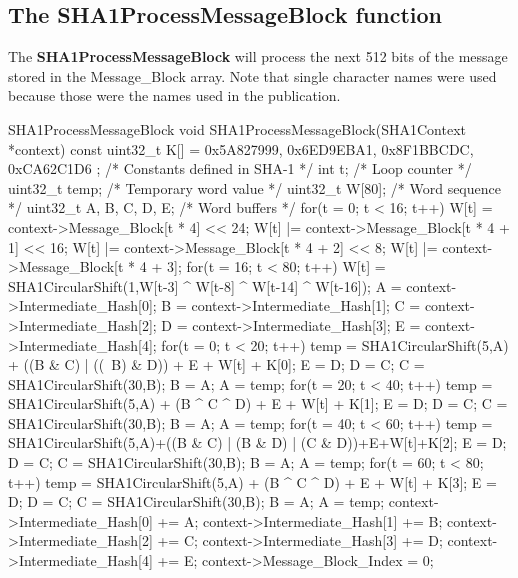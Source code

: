 \subsection{The SHA1ProcessMessageBlock function}
\label{ProcessMessageBlock}
The {\bf SHA1ProcessMessageBlock} will process the next 512 bits 
of the message stored in the Message\_Block array.
Note that single character names were used because those were the
names used in the publication.
\begin{chunk}{SHA1ProcessMessageBlock}
void SHA1ProcessMessageBlock(SHA1Context *context) {
  const uint32_t K[] = { 0x5A827999, 0x6ED9EBA1, 0x8F1BBCDC, 0xCA62C1D6 };
                              /* Constants defined in SHA-1  */
  int t;                      /* Loop counter                */
  uint32_t temp;              /* Temporary word value        */
  uint32_t W[80];             /* Word sequence               */
  uint32_t A, B, C, D, E;     /* Word buffers                */
  for(t = 0; t < 16; t++) {
    W[t] = context->Message_Block[t * 4] << 24;
    W[t] |= context->Message_Block[t * 4 + 1] << 16;
    W[t] |= context->Message_Block[t * 4 + 2] << 8;
    W[t] |= context->Message_Block[t * 4 + 3];
  }
  for(t = 16; t < 80; t++) {
    W[t] = SHA1CircularShift(1,W[t-3] ^ W[t-8] ^ W[t-14] ^ W[t-16]);
  }
  A = context->Intermediate_Hash[0];
  B = context->Intermediate_Hash[1];
  C = context->Intermediate_Hash[2];
  D = context->Intermediate_Hash[3];
  E = context->Intermediate_Hash[4];
  for(t = 0; t < 20; t++) {
    temp =  SHA1CircularShift(5,A) + ((B & C) | ((~B) & D)) + E + W[t] + K[0];
    E = D;
    D = C;
    C = SHA1CircularShift(30,B);
    B = A;
    A = temp;
  }
  for(t = 20; t < 40; t++) {
    temp = SHA1CircularShift(5,A) + (B ^ C ^ D) + E + W[t] + K[1];
    E = D;
    D = C;
    C = SHA1CircularShift(30,B);
    B = A;
    A = temp;
  }
  for(t = 40; t < 60; t++) {
    temp = SHA1CircularShift(5,A)+((B & C) | (B & D) | (C & D))+E+W[t]+K[2];
    E = D;
    D = C;
    C = SHA1CircularShift(30,B);
    B = A;
    A = temp;
  }
  for(t = 60; t < 80; t++) {
    temp = SHA1CircularShift(5,A) + (B ^ C ^ D) + E + W[t] + K[3];
    E = D;
    D = C;
    C = SHA1CircularShift(30,B);
    B = A;
    A = temp;
  }
  context->Intermediate_Hash[0] += A;
  context->Intermediate_Hash[1] += B;
  context->Intermediate_Hash[2] += C;
  context->Intermediate_Hash[3] += D;
  context->Intermediate_Hash[4] += E;
  context->Message_Block_Index = 0;
}

\end{chunk}

